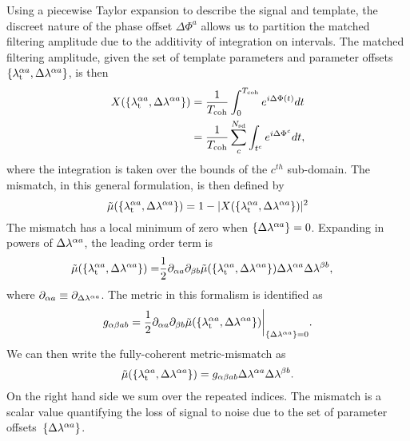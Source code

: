 \documentclass[../full_thesis/full_thesis.tex]{subfiles}
\begin{document}
Using a piecewise Taylor expansion
to describe the signal and template, the discreet nature of the phase offset
$\Delta\Phi^{a}$ allows us to partition the matched filtering amplitude due to
the additivity of integration on intervals. The matched filtering amplitude,
given the set of template parameters and parameter offsets $\{{\lambda}_\textrm{t}^{\alpha a},
\Delta\lambda^{\alpha a}\}$, is then
\begin{align}
\begin{split}
X(\{{\lambda}_\textrm{t}^{\alpha a}, \Delta\lambda^{\alpha a}\}) & =
\frac{1}{T_{\mathrm{coh}}}\int_{0}^{T_{\mathrm{coh}}}e^{i \Delta \Phi(t)}dt  \\
& =  \frac{1}{T_{\mathrm{coh}}}\sum_{c}^{N_{\textrm{sd}}} \int_{t^{c}}e^{i \Delta \Phi^{c}}dt,
\end{split}
\end{align}
where the integration is taken over the bounds of the $c^{th}$ sub-domain. The
mismatch, in this general formulation, is then defined by
\begin{equation}
\tilde{\mu}(\{{\lambda}_\textrm{t}^{\alpha a}, \Delta\lambda^{\alpha a}\}) =
 1 -  |X(\{{\lambda}_\textrm{t}^{\alpha a}, \Delta\lambda^{\alpha a}\})|^{2}
\end{equation}
The mismatch has a local minimum of zero when $\{\Delta\lambda^{\alpha a}\}=0$. Expanding in powers of
$\Delta\lambda^{\alpha a}$, the leading order term is
\begin{align}
\begin{split}
\tilde{\mu}(\{{\lambda}_\textrm{t}^{\alpha a}, \Delta\lambda^{\alpha a}\}) =
 & \frac{1}{2} \partial_{\alpha a} \partial_{\beta b}
                \tilde{\mu}(\{{\lambda}_\textrm{t}^{\alpha a}, \Delta\lambda^{\alpha a}\})
                \Delta\lambda^{\alpha a}\Delta\lambda^{\beta b},
\label{eqn: mismatch expansion}
\end{split}
\end{align}
where $\partial_{\alpha a} \equiv \partial_{\Delta\lambda^{\alpha a}}$.  The metric in
this formalism is identified as
\begin{equation}
g_{\alpha\beta ab} =
\frac{1}{2} \partial_{\alpha a} \partial_{\beta b}
            \tilde{\mu}(\{{\lambda}_\textrm{t}^{\alpha a}, \Delta\lambda^{\alpha a}\})
            \biggr\rvert_{\{\Delta\lambda^{\alpha a}\}=0}.
\end{equation}
We can then write the fully-coherent metric-mismatch as
\begin{equation}
\tilde{\mu}(\{{\lambda}_\textrm{t}^{\alpha a}, \Delta\lambda^{\alpha a}\}) =
 g_{\alpha\beta ab} \Delta\lambda^{\alpha a}\Delta\lambda^{\beta b}.
\label{eqn: mismatch}
\end{equation}
On the right hand side we sum over the repeated indices. The mismatch is a
scalar value quantifying the loss of signal to noise due to the set of
parameter offsets~$\{\Delta\lambda^{\alpha a}\}$.
\end{document}
